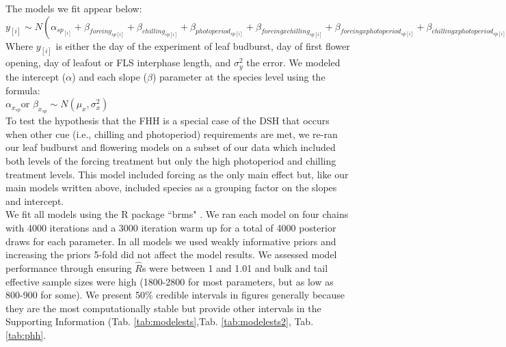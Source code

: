 \documentclass[12pt]{article}\usepackage[]{graphicx}\usepackage[]{color}
\begin{document}
The models we fit appear below:\\

$y_{[i]} \sim N(\alpha_{sp_{[i]}}+\beta_{forcing_{sp[i]}}+\beta_{chilling_{sp[i]}}+\beta_{photoperiod_{sp[i]}}+\beta_{forcing x chilling_{sp[i]}}+\beta_{forcing x photoperiod_{sp[i]}}+\beta_{chilling x photoperiod_{sp[i]}}, \sigma_y^2)$\\

Where $y_{[i]}$ is either the day of the experiment of leaf budburst, day of first flower opening, day of leafout or FLS interphase length, and $\sigma_y^2$ the error.  We modeled the intercept ($\alpha$) and each slope ($\beta$) parameter at the species level using the formula:\\

$\alpha_{x_{sp}} $or $\beta_{x_{sp}} \sim N(\mu_x,\sigma^2_x)$\\

\noindent To test the hypothesis that the FHH is a special case of the DSH that occurs when other cue (i.e., chilling and photoperiod) requirements are met, we re-ran our leaf budburst and flowering models on a subset of our data which included both levels of the forcing treatment but only the high photoperiod and chilling treatment levels. This model included forcing as the only main effect but, like our main models written above, included species as a grouping factor on the slopes and intercept.\\ 

\noindent We fit all models using the R package ``brms" \citep{Burkner2018}. We ran each model on four chains with 4000 iterations and a 3000 iteration warm up for a total of 4000 posterior draws for each parameter. In all models we used weakly informative priors and increasing the priors 5-fold did not affect the model results. We assessed  model performance through ensuring $\hat{R}$s were between 1 and 1.01 and bulk and tail effective sample sizes were high (1800-2800 for most parameters, but as low as  800-900 for some). We present 50\% credible intervals in figures generally because they are the most computationally stable \citep{Gelman2013} but provide other intervals in the Supporting Information (Tab. \ref{tab:modelests},Tab. \ref{tab:modelests2}, Tab. \ref{tab:phh}. \\
\end{document}
